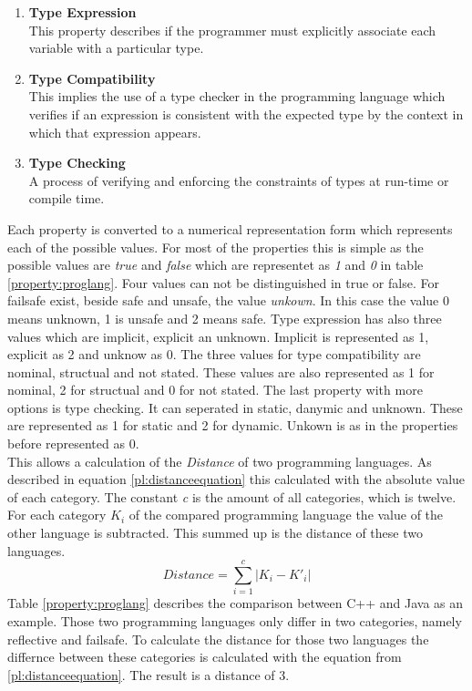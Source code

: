 \begin{enumerate}
	\item \textbf{Type Expression}\\ This property describes if the programmer must explicitly associate each variable with a particular type.
	\item \textbf{Type Compatibility}\\ This implies the use of a type checker in the programming language which verifies if an expression is consistent with the expected type by the context in which that expression appears.
	\item \textbf{Type Checking}\\ A process of verifying and enforcing the constraints of types at run-time or compile time.\\
\end{enumerate}
Each property is converted to a numerical representation form which represents each of the possible values. For most of the properties this is simple as the possible values are \textit{true} and \textit{false} which are representet as \textit{1} and \textit{0} in table \ref{property:proglang}. Four values can not be distinguished in true or false. For failsafe exist, beside safe and unsafe, the value \textit{unkown}. In this case the value 0 means unknown, 1 is unsafe and 2 means safe. Type expression has also three values which are implicit, explicit an unknown. Implicit is represented as 1, explicit as 2 and unknow as 0. The three values for type compatibility are nominal, structual and not stated. These values are also represented as 1 for nominal, 2 for structual and 0 for not stated. The last property with more options is type checking. It can seperated in static, danymic and unknown. These are represented as 1 for static and 2 for dynamic. Unkown is as in the properties before represented as 0.\\
This allows a calculation of the \textit{Distance} of two programming languages. As described in equation \ref{pl:distanceequation} this calculated with the absolute value of each category. The constant \textit{c} is the amount of all categories, which is twelve. For each category \textit{$K_i$} of the compared programming language the value of the other language is subtracted. This summed up is the distance of these two languages.
\begin{equation}
\textit{Distance} = \sum \limits_{i=1}^c \lvert K_i - K'_i\rvert \label{pl:distanceequation}
\end{equation}
Table \ref{property:proglang} describes the comparison between C++ and Java as an example. Those two programming languages only differ in two categories, namely reflective and failsafe. To calculate the distance for those two languages the differnce between these categories is calculated with the equation from \ref{pl:distanceequation}. The result is a distance of 3.\\

